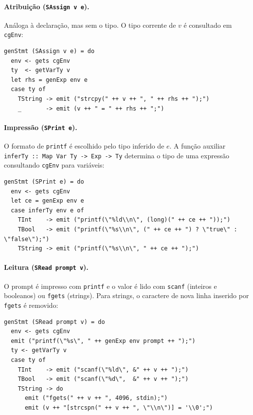 \paragraph{Atribuição (\texttt{SAssign v e}).}
Análoga à declaração, mas sem o tipo.  O tipo corrente de $v$ é consultado
em \texttt{cgEnv}:

\begin{verbatim}
genStmt (SAssign v e) = do
  env <- gets cgEnv
  ty  <- getVarTy v
  let rhs = genExp env e
  case ty of
    TString -> emit ("strcpy(" ++ v ++ ", " ++ rhs ++ ");")
    _       -> emit (v ++ " = " ++ rhs ++ ";")
\end{verbatim}

\paragraph{Impressão (\texttt{SPrint e}).}
O formato de \texttt{printf} é escolhido pelo tipo inferido de $e$.  A função
auxiliar \texttt{inferTy :: Map Var Ty -> Exp -> Ty} determina o tipo de uma
expressão consultando \texttt{cgEnv} para variáveis:

\begin{verbatim}
genStmt (SPrint e) = do
  env <- gets cgEnv
  let ce = genExp env e
  case inferTy env e of
    TInt    -> emit ("printf(\"%ld\\n\", (long)(" ++ ce ++ "));")
    TBool   -> emit ("printf(\"%s\\n\", (" ++ ce ++ ") ? \"true\" : \"false\");")
    TString -> emit ("printf(\"%s\\n\", " ++ ce ++ ");")
\end{verbatim}

\paragraph{Leitura (\texttt{SRead prompt v}).}
O prompt é impresso com \texttt{printf} e o valor é lido com \texttt{scanf}
(inteiros e booleanos) ou \texttt{fgets} (strings).  Para strings, o
caractere de nova linha inserido por \texttt{fgets} é removido:

\begin{verbatim}
genStmt (SRead prompt v) = do
  env <- gets cgEnv
  emit ("printf(\"%s\", " ++ genExp env prompt ++ ");")
  ty <- getVarTy v
  case ty of
    TInt    -> emit ("scanf(\"%ld\", &" ++ v ++ ");")
    TBool   -> emit ("scanf(\"%d\",  &" ++ v ++ ");")
    TString -> do
      emit ("fgets(" ++ v ++ ", 4096, stdin);")
      emit (v ++ "[strcspn(" ++ v ++ ", \"\\n\")] = '\\0';")
\end{verbatim}

